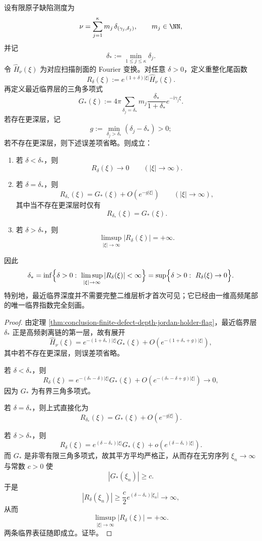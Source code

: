 \begin{theorem}[最浅缺陷层的临界尾指数判别]\label{thm:conclusion-finite-defect-critical-tail-exponent}
设有限原子缺陷测度为
\[
\nu=\sum_{j=1}^{\kappa}m_j\,\delta_{(\gamma_j,\delta_j)},
\qquad
m_j\in\NN,
\]
并记
\[
\delta_*:=\min_{1\le j\le \kappa}\delta_j.
\]
令 \(\widehat H_\nu(\xi)\) 为对应扫描剖面的 Fourier 变换。对任意 \(\delta>0\)，定义重整化尾函数
\[
R_\delta(\xi):=e^{(1+\delta)|\xi|}\widehat H_\nu(\xi).
\]
再定义最近临界层的三角多项式
\[
G_*(\xi):=
4\pi\sum_{\delta_j=\delta_*}
m_j\frac{\delta_*}{1+\delta_*}e^{-\mathrm{i}\gamma_j\xi}.
\]
若存在更深层，记
\[
g:=\min_{\delta_j>\delta_*}(\delta_j-\delta_*)>0;
\]
若不存在更深层，则下述误差项省略。则成立：
\begin{enumerate}
  \item 若 \(\delta<\delta_*\)，则
  \[
  R_\delta(\xi)\longrightarrow 0
  \qquad (|\xi|\to\infty).
  \]
  \item 若 \(\delta=\delta_*\)，则
  \[
  R_{\delta_*}(\xi)=G_*(\xi)+O\!\left(e^{-g|\xi|}\right)
  \qquad (|\xi|\to\infty),
  \]
  其中当不存在更深层时仅有
  \[
  R_{\delta_*}(\xi)=G_*(\xi).
  \]
  \item 若 \(\delta>\delta_*\)，则
  \[
  \limsup_{|\xi|\to\infty}|R_\delta(\xi)|=+\infty.
  \]
\end{enumerate}
因此
\[
\delta_*
=
\inf\Bigl\{
\delta>0:\ \limsup_{|\xi|\to\infty}|R_\delta(\xi)|<\infty
\Bigr\}
=
\sup\Bigl\{
\delta>0:\ R_\delta(\xi)\to 0
\Bigr\}.
\]
特别地，最近临界深度并不需要完整二维层析才首次可见；它已经由一维高频尾部的唯一临界指数完全刻画。
\end{theorem}
\begin{proof}
由定理 \ref{thm:conclusion-finite-defect-depth-jordan-holder-flag}，最近临界层 \(\delta_*\) 正是高频剥离链的第一层，故有展开
\[
\widehat H_\nu(\xi)
=
e^{-(1+\delta_*)|\xi|}G_*(\xi)
+ O\!\left(e^{-(1+\delta_*+g)|\xi|}\right),
\]
其中若不存在更深层，则误差项省略。

若 \(\delta<\delta_*\)，则
\[
R_\delta(\xi)
=
e^{-(\delta_*-\delta)|\xi|}G_*(\xi)
+ O\!\left(e^{-(\delta_*-\delta+g)|\xi|}\right)\to 0,
\]
因为 \(G_*\) 为有界三角多项式。

若 \(\delta=\delta_*\)，则上式直接化为
\[
R_{\delta_*}(\xi)=G_*(\xi)+O\!\left(e^{-g|\xi|}\right).
\]

若 \(\delta>\delta_*\)，则
\[
R_\delta(\xi)
=
e^{(\delta-\delta_*)|\xi|}G_*(\xi)
+ o\!\left(e^{(\delta-\delta_*)|\xi|}\right).
\]
而 \(G_*\) 是非零有限三角多项式，故其平方平均严格正，从而存在无穷序列 \(\xi_n\to\infty\) 与常数 \(c>0\) 使
\[
|G_*(\xi_n)|\ge c.
\]
于是
\[
|R_\delta(\xi_n)|\ge \frac{c}{2}e^{(\delta-\delta_*)|\xi_n|}\to\infty,
\]
从而
\[
\limsup_{|\xi|\to\infty}|R_\delta(\xi)|=+\infty.
\]
两条临界表征随即成立。证毕。
\end{proof}

